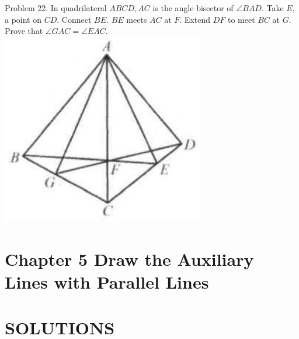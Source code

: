 \documentclass[10pt]{article}
\begin{document}
Problem 22. In quadrilateral \(A B C D, A C\) is the angle bisector of \(\angle B A D\). Take \(E\), a point on \(C D\). Connect \(B E\). \(B E\) meets \(A C\) at \(F\). Extend \(D F\) to meet \(B C\) at \(G\). Prove that \(\angle G A C=\angle E A C\).\\
\includegraphics[max width=\textwidth, center]{2025_04_17_97bc1f7e44d93c271a88g-130}

\section*{Chapter 5 Draw the Auxiliary Lines with Parallel Lines}
\section*{SOLUTIONS}
\end{document}
